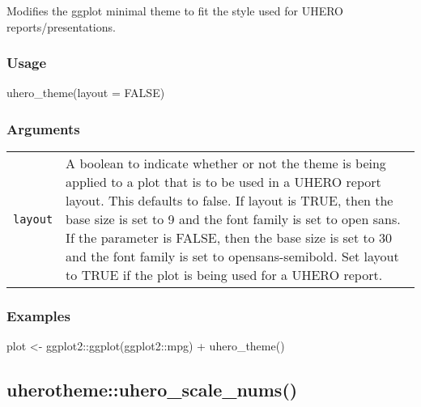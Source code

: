 \documentclass[
  letterpaper,
  DIV=11,
  numbers=noendperiod]{scrreport}
\newenvironment{Shaded}{\begin{snugshade}}{\end{snugshade}}
\newcommand{\AttributeTok}[1]{\textcolor[rgb]{0.40,0.45,0.13}{#1}}
\newcommand{\ConstantTok}[1]{\textcolor[rgb]{0.56,0.35,0.01}{#1}}
\newcommand{\FunctionTok}[1]{\textcolor[rgb]{0.28,0.35,0.67}{#1}}
\newcommand{\NormalTok}[1]{\textcolor[rgb]{0.00,0.23,0.31}{#1}}
\newcommand{\OtherTok}[1]{\textcolor[rgb]{0.00,0.23,0.31}{#1}}
\newcommand{\SpecialCharTok}[1]{\textcolor[rgb]{0.37,0.37,0.37}{#1}}
\begin{document}
Modifies the ggplot minimal theme to fit the style used for UHERO
reports/presentations.

\subsubsection{Usage}\label{usage-69}

\begin{Shaded}
\begin{Highlighting}[]
\FunctionTok{uhero\_theme}\NormalTok{(}\AttributeTok{layout =} \ConstantTok{FALSE}\NormalTok{)}
\end{Highlighting}
\end{Shaded}

\subsubsection{Arguments}\label{arguments-69}

\begin{longtable}[]{@{}ll@{}}
\toprule\noalign{}
\endhead
\bottomrule\noalign{}
\endlastfoot
\texttt{layout} & A boolean to indicate whether or not the theme is
being applied to a plot that is to be used in a UHERO report layout.
This defaults to false. If layout is TRUE, then the base size is set to
9 and the font family is set to open sans. If the parameter is FALSE,
then the base size is set to 30 and the font family is set to
opensans-semibold. Set layout to TRUE if the plot is being used for a
UHERO report. \\
\end{longtable}

\subsubsection{Examples}\label{examples-69}

\begin{Shaded}
\begin{Highlighting}[]
\NormalTok{plot }\OtherTok{\textless{}{-}}\NormalTok{ ggplot2}\SpecialCharTok{::}\FunctionTok{ggplot}\NormalTok{(ggplot2}\SpecialCharTok{::}\NormalTok{mpg) }\SpecialCharTok{+} \FunctionTok{uhero\_theme}\NormalTok{()}
\end{Highlighting}
\end{Shaded}

\subsection{uherotheme::uhero\_scale\_nums()}\label{uherothemeuhero_scale_nums}
\end{document}
